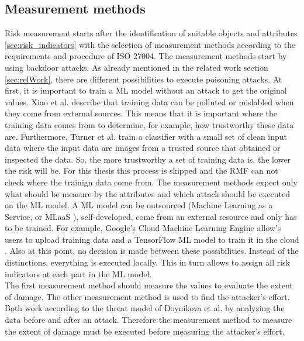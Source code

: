 \subsection{Measurement methods}

Risk measurement starts after the identification of suitable objects and attributes \ref{sec:risk_indicators} with the selection of measurement methods according to the requirements and procedure of ISO 27004. The measurement methods start by using backdoor attacks. As already mentioned in the related work section \ref{sec:relWork}, there are different possibilities to execute poisoning attacks. At first, it is important to train a ML model without an attack to get the original values.
Xiao et al. \cite{DBLP:conf/sp/XiaoLZX18} describe that training data can be polluted or mislabled when they come from external sources. This means that it is important where the training data comes from to determine, for example, how trustworthy these data are. Furthermore, Turner et al. \cite{turner2018clean} train a classifier with a
small set of clean input data where the input data are images from a trusted source that obtained or inspected the data. So, the more trustworthy a set of training data is, the lower the risk will be. For this thesis this process is skipped and the RMF can not check where the trainign data come from. The measurement methods expect only what should be measure by the attributes and which attack should be executed on the ML model. A ML model can be outsourced (Machine Learning as a Service, or MLaaS \cite{DBLP:journals/corr/abs-1708-06733}), self-developed, come from an external resource and only has to be trained. For example, Google's Cloud Machine Learning Engine \cite{google_ai2022} allow's users to upload training data and a TensorFlow ML model to train it in the cloud \cite{DBLP:journals/corr/abs-1708-06733}. Also at this point, no decision is made between these possibilities. Instead of the distinctions, everything is executed locally. This in turn allows to assign all risk indicators at each part in the ML model. \\ The first measurement method should measure the values to evaluate the extent of damage. The other measurement method is used to find the attacker's effort. Both work according to the threat model of Doynikova et al. \cite{DBLP:conf/crisis/DoynikovaNGK20} by analyzing the data before and after an attack. Therefore the measurement method to measure the extent of
damage must be executed before measuring the attacker's effort.


